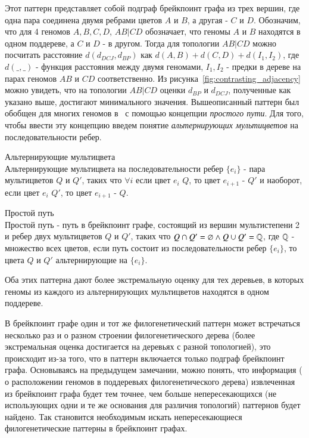 Этот паттерн представляет собой подграф брейкпоинт графа из трех вершин, где одна пара соединена двумя ребрами цветов $A$ и $B$, а другая - $C$ и $D$.
Обозначим, что для 4 геномов $A, B, C, D$, $AB|CD$ обозначает, что геномы $A$ и $B$ находятся в одном поддереве, а $C$ и $D$ - в другом.
Тогда для топологии $AB|CD$ можно посчитать расстояние $d (d_{DCJ}, d_{BP})$ как $d(A, B) + d(C, D) + d(I_1, I_2)$,
где $d(\_, \_)$ - функция расстояния между двумя геномами, $I_1, I_2$ - предки в дереве на парах геномов $AB$ и $CD$ соответственно.
Из рисунка~\ref{fig:contrasting_adjacency} можно увидеть, что на топологии $AB|CD$ оценки $d_{BP}$ и $d_{DCJ}$, полученные как указано выше, достигают минимального значения.
Вышеописанный паттерн был обобщен для многих геномов в~\cite{Alekseyev2009} с помощью концепции \textit{простого пути}.
Для того, чтобы ввести эту концепцию введем понятие \textit{альтернирующих мультицветов} на последовательности ребер.
\begin{define}{Альтернирующие мультицвета} \\
  Альтернирующие мультицвета на последовательности ребер $\{e_i\}$ - пара мультицветов $Q$ и $Q'$, таких что
  $\forall i$ если цвет $e_i$ $Q$, то цвет $e_{i + 1}$ - $Q'$ и наоборот, если цвет $e_i$ $Q'$, то цвет $e_{i + 1}$ - $Q$.
\end{define}

\begin{define}{Простой путь} \\
  Простой путь - путь в брейкпоинт графе, состоящий из вершин мультистепени 2 и ребер двух
  мультицветов $Q$ и $Q'$, таких что $Q \cap Q' = \varnothing \land Q \cup Q' = \mathbb{Q}$,
  где $\mathbb{Q}$ - множество всех цветов, если путь состоит из последовательности ребер $\{e_i\}$,
  то цвета $Q$ и $Q'$ альтернирующие на $\{e_i\}$.
\end{define}
Оба этих паттерна дают более экстремальную оценку для тех деревьев,
в которых геномы из каждого из альтернирующих мультицветов находятся в одном поддереве.

В брейкпоинт графе один и тот же филогенетический паттерн может встречаться несколько раз и
 о разном строении филогенетического дерева (более экстремальная оценка достигается на деревьях с разной топологией),
это происходит из-за того, что в паттерн включается только подграф брейкпоинт графа.
Основываясь на предыдущем замечании, можно понять, что информация ( о расположении геномов в поддеревьях филогенетического дерева)
извлеченная из брейкпоинт графа будет тем точнее,
чем больше непересекающихся (не использующих одни и те же основания для различия топологий) паттернов будет найдено.
Так становится необходимым искать непересекающиеся филогенетические паттерны в брейкпоинт графах.

